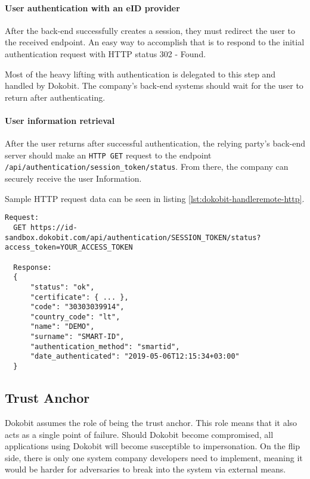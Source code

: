 \paragraph{User authentication with an eID provider}

After the back-end successfully creates a session, they must redirect the user to the received endpoint. An easy way to accomplish that is to respond to the initial authentication request with HTTP status 302 - Found.

Most of the heavy lifting with authentication is delegated to this step and handled by Dokobit. The company's back-end systems should wait for the user to return after authenticating.

\paragraph{User information retrieval}

After the user returns after successful authentication, the relying party's back-end server should make an \texttt{HTTP GET} request to the endpoint \texttt{/api/authentication/session\_token/status}. From there, the company can securely receive the user Information.

Sample HTTP request data can be seen in listing \ref{lst:dokobit-handleremote-http}.

\begin{lstlisting}[caption={Handling Dokobit session creation}, label={lst:dokobit-handleremote-http}]
  Request:
  GET https://id-sandbox.dokobit.com/api/authentication/SESSION_TOKEN/status?access_token=YOUR_ACCESS_TOKEN
  
  Response:
  {
      "status": "ok",
      "certificate": { ... },
      "code": "30303039914",
      "country_code": "lt",
      "name": "DEMO",
      "surname": "SMART-ID",
      "authentication_method": "smartid",
      "date_authenticated": "2019-05-06T12:15:34+03:00"
  }
\end{lstlisting}

\subsection{Trust Anchor}

Dokobit assumes the role of being the trust anchor. This role means that it also acts as a single point of failure. Should Dokobit become compromised, all applications using Dokobit will become susceptible to impersonation. On the flip side, there is only one system company developers need to implement, meaning it would be harder for adversaries to break into the system via external means.

